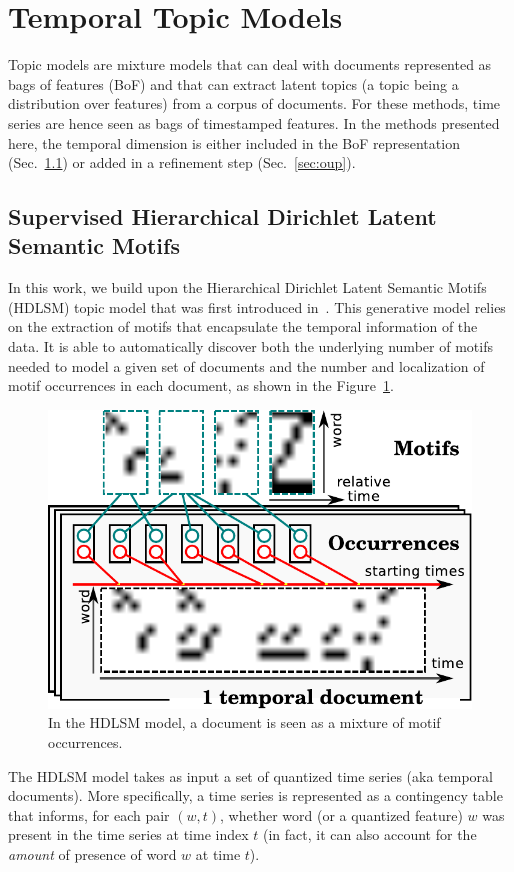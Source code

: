 \section{Temporal Topic Models}
\label{sec:topics}

Topic models are mixture models that can deal with documents represented as
bags of features (BoF) and that can extract latent topics (a topic being a
distribution
over features) from a corpus of documents.
For these methods, time series are hence seen as bags of timestamped features.
In the methods presented here, the temporal dimension is either
included in the BoF representation (Sec.~\ref{sec:hdlsm}) or added in a
refinement step (Sec.~\ref{sec:oup}).

\subsection{Supervised Hierarchical Dirichlet Latent Semantic Motifs}
\label{sec:hdlsm}

In this work, we build upon the Hierarchical Dirichlet Latent Semantic Motifs
(HDLSM) topic model that was first introduced in~\cite{EmonetCVPR2011}.
This generative model relies on the extraction of motifs that encapsulate the
temporal information of the data.
It is able to automatically discover both the underlying number of motifs
needed to
model a given set of documents and the number and localization of motif
occurrences in each document, as shown in the Figure~\ref{fig:hdlsm}.

\begin{figure}
\centering
\includegraphics[width=.4\textwidth]{fig/hdlsm}
\caption{In the HDLSM model, a document is seen as a mixture of motif
occurrences. \label{fig:hdlsm}}
\end{figure} 

The HDLSM model takes as input a set of quantized time series (aka temporal
documents).
More specifically, a time series is represented as a contingency table that
informs, for
each pair $(w, t)$, whether word (or a quantized feature) $w$ was
present in the time series at time index $t$ (in fact, it can also account for
the \emph{amount} of presence of word $w$ at time $t$).


